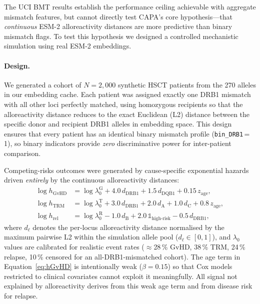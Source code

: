 \documentclass[11pt,a4paper]{article}
\begin{document}
The UCI BMT results establish the performance ceiling achievable with aggregate
mismatch features, but cannot directly test CAPA's core hypothesis---that
\emph{continuous} ESM-2 alloreactivity distances are more predictive than binary
mismatch flags.  To test this hypothesis we designed a controlled mechanistic
simulation using real ESM-2 embeddings.

\paragraph{Design.}
We generated a cohort of $N = 2{,}000$ synthetic HSCT patients from the 270
alleles in our embedding cache.  Each patient was assigned exactly one DRB1
mismatch with all other loci perfectly matched, using homozygous recipients so
that the alloreactivity distance reduces to the exact Euclidean (L2) distance
between the specific donor and recipient DRB1 alleles in embedding space.  This
design ensures that every patient has an identical binary mismatch profile
(\texttt{bin\_DRB1}\,=\,1), so binary indicators provide \emph{zero}
discriminative power for inter-patient comparison.

Competing-risks outcomes were generated by cause-specific exponential hazards
driven \emph{entirely} by the continuous alloreactivity distances:
\begin{align}
\log h_{\mathrm{GvHD}} &= \log \lambda_0^{\mathrm{G}} + 4.0\,d_{\mathrm{DRB1}} + 1.5\,d_{\mathrm{DQB1}} + 0.15\,z_{\mathrm{age}}, \label{eq:hGvHD}\\
\log h_{\mathrm{TRM}}  &= \log \lambda_0^{\mathrm{T}} + 3.0\,d_{\mathrm{DRB1}} + 2.0\,d_{\mathrm{A}} + 1.0\,d_{\mathrm{C}} + 0.8\,z_{\mathrm{age}},\\
\log h_{\mathrm{rel}}  &= \log \lambda_0^{\mathrm{R}} - 1.0\,d_{\mathrm{B}} + 2.0\,\mathbb{1}_{\mathrm{high\text{-}risk}} - 0.5\,d_{\mathrm{DRB1}},
\end{align}
where $d_{\ell}$ denotes the per-locus alloreactivity distance normalised by the
maximum pairwise L2 within the simulation allele pool ($d_{\ell} \in [0,1]$), and
$\lambda_0$ values are calibrated for realistic event rates
($\approx$28\,\% GvHD, 38\,\% TRM, 24\,\% relapse, 10\,\% censored for an all-DRB1-mismatched cohort).
The age term in Equation~\eqref{eq:hGvHD} is intentionally weak ($\beta = 0.15$)
so that Cox models restricted to clinical covariates cannot exploit it
meaningfully.  All signal not explained by alloreactivity derives from this
weak age term and from disease risk for relapse.
\end{document}
